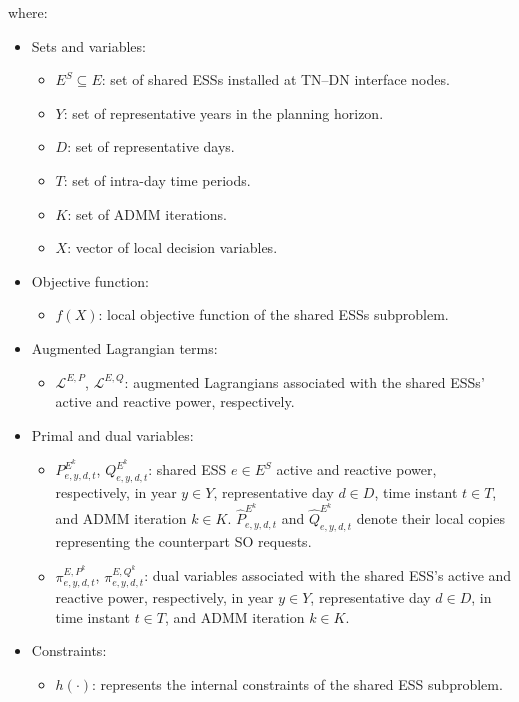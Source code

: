 \documentclass[preprint,12pt]{elsarticle}
\begin{document}
\noindent
where:
\begin{itemize}
    \item Sets and variables:
    \begin{itemize}
        \item $E^S \subseteq E$: set of shared ESSs installed at TN--DN interface nodes.
        \item $Y$: set of representative years in the planning horizon.
        \item $D$: set of representative days.
        \item $T$: set of intra-day time periods.
        \item $K$: set of ADMM iterations.
        \item $X$: vector of local decision variables.
    \end{itemize}
    \item Objective function:
    \begin{itemize}
        \item $f(X)$: local objective function of the shared ESSs subproblem.
    \end{itemize}
    \item Augmented Lagrangian terms:
    \begin{itemize}
        \item $\mathcal{L}^{E,P}$, $\mathcal{L}^{E,Q}$: augmented Lagrangians associated with the shared ESSs' active and reactive power, respectively.
    \end{itemize}
    \item Primal and dual variables:
    \begin{itemize}
        \item $P^{E^k}_{e,y,d,t}$, $Q^{E^k}_{e,y,d,t}$: shared ESS $e \in E^S$ active and reactive power, respectively, in year $y \in Y$, representative day $d \in D$, time instant $t \in T$, and ADMM iteration $k \in K$.
        $\hat{P}^{E^k}_{e,y,d,t}$ and $\hat{Q}^{E^k}_{e,y,d,t}$ denote their local copies representing the counterpart SO requests.
        \item $\pi^{{E,P}^k}_{e,y,d,t}$, $\pi^{{E,Q}^k}_{e,y,d,t}$: dual variables associated with the shared ESS's active and reactive power, respectively, in year $y \in Y$, representative day $d \in D$, in time instant $t \in T$, and ADMM iteration $k \in K$.
    \end{itemize}
    \item Constraints:
    \begin{itemize}
        \item $h(\cdot)$: represents the internal constraints of the shared ESS subproblem.
    \end{itemize}
\end{itemize}
\end{document}
